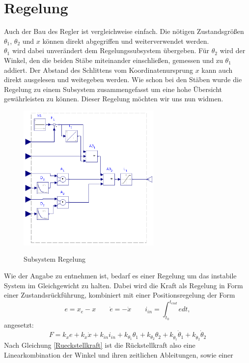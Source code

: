 \documentclass[a4paper, 10pt]{report}
\begin{document}
\section{Regelung}
Auch der Bau des Regler ist vergleichweise einfach. Die nötigen Zustandsgrößen $\theta_{1}$, $\theta_{2}$ und $x$ können direkt abgegriffen und weiterverwendet werden. \\
$\theta_{1}$ wird dabei unverändert dem Regelungssubsystem übergeben. Für $\theta_{2}$ wird der Winkel, den die beiden Stäbe miteinander einschließen, gemessen und zu $\theta_{1}$ addiert. Der Abstand des Schlittens vom Koordinatenursprung $x$ kann auch direkt ausgelesen und weitegeben werden. 
Wie schon bei den Stäben wurde die Regelung zu einem Subsystem zusammengefasst um eine hohe Übersicht gewährleisten zu können. Dieser Regelung möchten wir uns nun widmen. \newpage
\begin{figure}
\centering  %
\label{SubsystemRegelung}
{\includegraphics[width=7cm]{MapleSimRegelungCut}}
\caption{Subsystem Regelung}
\end{figure}
\noindent
Wie der Angabe zu entnehmen ist, bedarf es einer Regelung um das instabile System im Gleichgewicht zu halten. Dabei wird die Kraft als Regelung in Form einer Zustandsrückführung, kombiniert mit einer Positionsregelung der Form
\begin{equation}
\label{Auslenkungen}
e = x_{e} - x \qquad \dot{e} = - \dot{x} \qquad i_{in} = \int_{t_{0}}^{t_{end}} e  dt,
\end{equation}
angesetzt:
\begin{equation}
\label{Rueckstellkraft}
F = k_{x}e + k_{\dot{x}}\dot{x} + k_{in}i_{in} + k_{\theta_{1}}\theta_{1} + k_{\theta_{2}}\theta_{2} + k_{\dot{\theta}_{1}}\dot{\theta}_{1} + k_{\dot{\theta}_{2}}\dot{\theta}_{2}
\end{equation}
Nach Gleichung \ref{Rueckstellkraft} ist die Rückstellkraft also eine Linearkombination der Winkel und ihren zeitlichen Ableitungen, sowie einer
\end{document}
